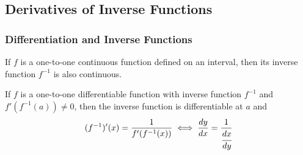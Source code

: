 \subsection{Derivatives of Inverse Functions}

\subsubsection*{Differentiation and Inverse Functions}
\begin{theorem}
    If \(f\) is a one-to-one continuous function defined on an interval,
    then its inverse function \(f^{-1}\) is also continuous.
\end{theorem}
\begin{theorem}
    If \(f\) is a one-to-one differentiable function with inverse function
    \(f^{-1}\) and \(f'(f^{-1}(a))\neq 0\), then the inverse function is
    differentiable at \(a\) and
    \[(f^{-1})'(x)=\frac{1}{f'(f^{-1}(x))}\iff\frac{dy}{dx}
    =\frac{1}{\cfrac{dx}{dy}}\]
\end{theorem}

